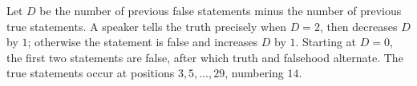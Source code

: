 Let $D$ be the number of previous false statements minus the number of previous true statements. A speaker tells the truth precisely when $D=2$, then decreases $D$ by $1$; otherwise the statement is false and increases $D$ by $1$. Starting at $D=0$, the first two statements are false, after which truth and falsehood alternate. The true statements occur at positions $3,5,\ldots,29$, numbering $\boxed{14}$.

